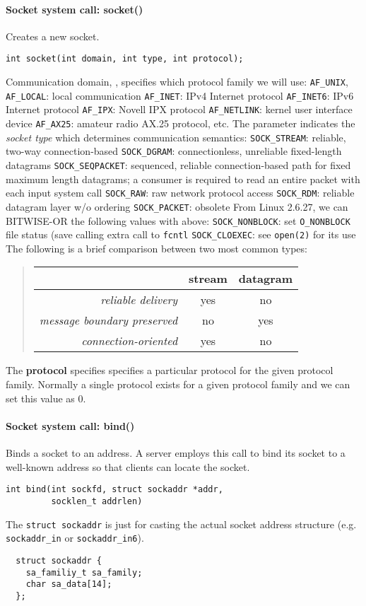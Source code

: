 \documentclass{memo}
\begin{document}
\paragraph{Socket system call: { socket()}} Creates a new socket.
\begin{verbatim}
int socket(int domain, int type, int protocol);
\end{verbatim}
Communication domain, , specifies which protocol family we will
use:
   \bit
   \w \verb+AF_UNIX+, \verb+AF_LOCAL+: local communication
   \w \verb+AF_INET+: IPv4 Internet protocol
   \w \verb+AF_INET6+: IPv6 Internet protocol
   \w \verb+AF_IPX+: Novell IPX  protocol
   \w \verb+AF_NETLINK+: kernel user interface device
   \w \verb+AF_AX25+: amateur radio AX.25 protocol, etc.
   \eit
The  parameter indicates the {\em socket type\/} which determines
communication semantics:
  \bit
  \w \verb+SOCK_STREAM+: reliable, two-way connection-based
  \w \verb+SOCK_DGRAM+: connectionless, unreliable fixed-length datagrams 
  \w \verb+SOCK_SEQPACKET+: sequenced, reliable connection-based path for
  fixed maximum length datagrams; a consumer is required to read an entire
  packet with each input system call
  \w \verb+SOCK_RAW+: raw network protocol access
  \w \verb+SOCK_RDM+: reliable datagram layer w/o ordering
  \w \verb+SOCK_PACKET+: obsolete
  \eit
From Linux 2.6.27, we can BITWISE-OR the following values with above:
 \bit
 \w \verb+SOCK_NONBLOCK+: set \verb+O_NONBLOCK+ file status (save calling
 extra call to \verb+fcntl+
 \w \verb+SOCK_CLOEXEC+: see \verb+open(2)+ for its use
 \eit
The following is a brief
comparison between two most common types:
\begin{quote}
\begin{tabular}{r|c|c|}
& {\bf stream} & {\bf datagram} \\ \hline
{\em reliable delivery} & yes & no \\
{\em message boundary preserved} & no & yes \\
{\em connection-oriented} & yes & no  \\ \hline
\end{tabular}
\end{quote}
The {\bf protocol} specifies specifies a particular protocol for the given
protocol family. Normally a single protocol exists for a given protocol family
and we can set this value as 0. 

\paragraph{Socket system call: { bind()}} Binds a socket to an address. A
server employs this call to bind its socket to a well-known address so that
clients can locate the socket.
\begin{verbatim}
int bind(int sockfd, struct sockaddr *addr, 
         socklen_t addrlen)
\end{verbatim}
The \verb+struct sockaddr+ is just for casting the actual socket address
structure (e.g. \verb+sockaddr_in+ or \verb+sockaddr_in6+).
\begin{verbatim}
  struct sockaddr {
    sa_familiy_t sa_family;
    char sa_data[14];
  }; 
\end{verbatim}
\end{document}
